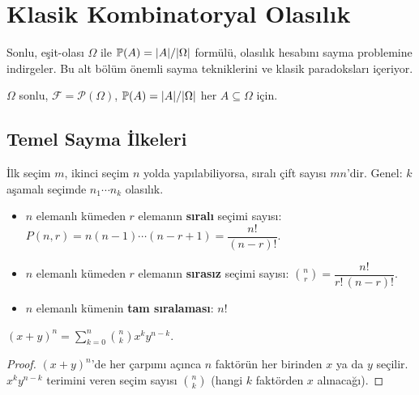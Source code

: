 \section{Klasik Kombinatoryal Olasılık}

\begin{motivasyon}[§2.6]
Sonlu, eşit-olası $\Omega$ ile $\mathbb{P}(A) = |A|/|\Omega|$ formülü, olasılık
hesabını sayma problemine indirgeler. Bu alt bölüm önemli sayma tekniklerini
ve klasik paradoksları içeriyor.
\end{motivasyon}

\begin{tanim}\label{def:klasik}
$\Omega$ sonlu, $\mathcal{F} = \mathcal{P}(\Omega)$,
$\mathbb{P}(A) = |A|/|\Omega|$ her $A \subseteq \Omega$ için.
\end{tanim}

\subsection{Temel Sayma İlkeleri}

\begin{teorem}\label{thm:carpim_ilkesi}
İlk seçim $m$, ikinci seçim $n$ yolda yapılabiliyorsa, sıralı çift sayısı $mn$'dir.
Genel: $k$ aşamalı seçimde $n_1 \cdots n_k$ olasılık.
\end{teorem}

\begin{tanim}\label{def:perm_komb}
\begin{itemize}
  \item $n$ elemanlı kümeden $r$ elemanın \textbf{sıralı} seçimi sayısı:
        $P(n,r) = n(n-1)\cdots(n-r+1) = \dfrac{n!}{(n-r)!}$.
  \item $n$ elemanlı kümeden $r$ elemanın \textbf{sırasız} seçimi sayısı:
        $\binom{n}{r} = \dfrac{n!}{r!\,(n-r)!}$.
  \item $n$ elemanlı kümenin \textbf{tam sıralaması}: $n!$
\end{itemize}
\end{tanim}

\begin{teorem}\label{thm:binom}
$(x+y)^n = \sum_{k=0}^n \binom{n}{k} x^k y^{n-k}$.
\end{teorem}

\begin{proof}
$(x+y)^n$'de her çarpımı açınca $n$ faktörün her birinden $x$ ya da $y$ seçilir.
$x^k y^{n-k}$ terimini veren seçim sayısı $\binom{n}{k}$ (hangi $k$ faktörden $x$ alınacağı).
\end{proof}

